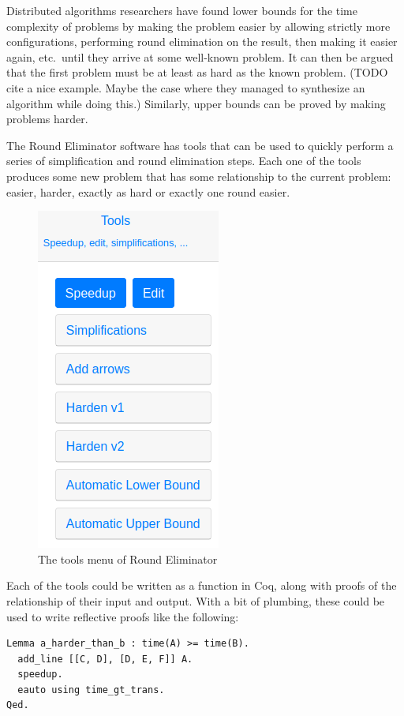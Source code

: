 \documentclass[english, 12pt, a4paper, sci, a-1b, online]{aaltothesis}
\begin{document}
Distributed algorithms researchers have found lower bounds for the time complexity of problems by making the problem easier by allowing strictly more configurations, performing round elimination on the result, then making it easier again, etc.\ until they arrive at some well-known problem. It can then be argued that the first problem must be at least as hard as the known problem. (TODO cite a nice example. Maybe the case where they managed to synthesize an algorithm while doing this.) Similarly, upper bounds can be proved by making problems harder.

The Round Eliminator software has tools that can be used to quickly perform a series of simplification and round elimination steps. Each one of the tools produces some new problem that has some relationship to the current problem: easier, harder, exactly as hard or exactly one round easier.

\begin{figure}[h]
  \centering
  \includegraphics[scale=0.5]{retools}
  \caption{The tools menu of Round Eliminator}
\end{figure}

Each of the tools could be written as a function in Coq, along with proofs of the relationship of their input and output. With a bit of plumbing, these could be used to write reflective proofs like the following:

\begin{verbatim}
Lemma a_harder_than_b : time(A) >= time(B).
  add_line [[C, D], [D, E, F]] A.
  speedup.
  eauto using time_gt_trans.
Qed.
\end{verbatim}
\end{document}
